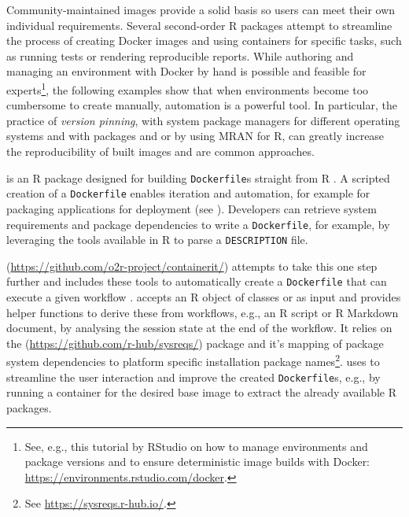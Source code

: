 Community-maintained images provide a solid basis so users can meet
their own individual requirements. Several second-order R packages
attempt to streamline the process of creating Docker images and using
containers for specific tasks, such as running tests or rendering
reproducible reports. While authoring and managing an environment with
Docker by hand is possible and feasible for
experts\footnote{See, e.g., this tutorial by RStudio on how to manage environments and package versions and to ensure deterministic image builds with Docker: \href{https://environments.rstudio.com/docker}{https://environments.rstudio.com/docker}.},
the following examples show that when environments become too cumbersome
to create manually, automation is a powerful tool. In particular, the
practice of \emph{version pinning}, with system package managers for
different operating systems and with packages  and
 or by using MRAN for R, can greatly increase the
reproducibility of built images and are common approaches.

\textbf{} is an R package designed for building
\texttt{Dockerfile}s straight from R \citep{cran_dockerfiler}. A
scripted creation of a \texttt{Dockerfile} enables iteration and
automation, for example for packaging applications for deployment (see
). Developers can retrieve system requirements and
package dependencies to write a \texttt{Dockerfile}, for example, by
leveraging the tools available in R to parse a \texttt{DESCRIPTION}
file.

\textbf{}
(\url{https://github.com/o2r-project/containerit/}) attempts to take
this one step further and includes these tools to automatically create a
\texttt{Dockerfile} that can execute a given workflow
\citep{nust_containerit_2019}.  accepts an R object of
classes  or  as input and
provides helper functions to derive these from workflows, e.g., an R
script or R Markdown document, by analysing the session state at the end
of the workflow. It relies on the 
(\url{https://github.com/r-hub/sysreqs/}) package and it's mapping of
package system dependencies to platform specific installation package
names\footnote{See \href{https://sysreqs.r-hub.io/}{https://sysreqs.r-hub.io/}.}.
 uses  to streamline the user
interaction and improve the created \texttt{Dockerfile}s, e.g., by
running a container for the desired base image to extract the already
available R packages.

